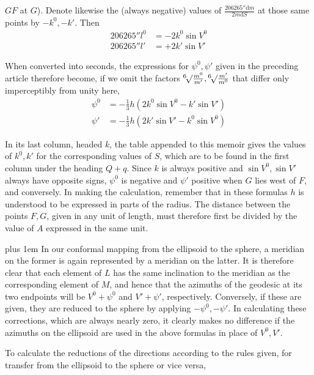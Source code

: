 %
\(GF\) at \(G\)). Denote likewise the (always negative) values of \(\tfrac{206265''\mathrm{d}m}{2m\mathrm{d}S}\) at those same points by \(-k^0,-k'\). Then
\[
\begin{aligned}
206265''l^0&=-2k^0\sin V^0\\
206265''l'&=+2k'\sin V'
\end{aligned}
\]

When converted into seconds, the expressions for \(\psi^0,\psi'\) given in the preceding article therefore become, if we omit the factors \(\BareRoot[6]{\tfrac{m^0}{m'}},\BareRoot[6]{\tfrac{m'}{m^0}}\) that differ only imperceptibly from unity here,
\[
\begin{aligned}
\psi^0&=-\tfrac{1}{3}h(2k^0\sin V^0-k'\sin V')\\
\psi'&=-\tfrac{1}{3}h(2k'\sin V'-k^0\sin V^0)
\end{aligned}
\]

In its last column, headed \(k\), the table appended to this memoir gives the values of \(k^0,k'\) for the corresponding values of \(S\), which are to be found in the first column under the heading \(Q+q\). Since \(k\) is always positive and \(\sin V^0,\sin V'\) always have opposite signs, \(\psi^0\) is negative and \(\psi'\) positive when \(G\) lies west of \(F\), and conversely. In making the calculation, remember that in these formulas \(h\) is understood to be expressed in parts of the radius. The distance between the points \(F,G\), given in any unit of length, must therefore first be divided by the value of \(A\) expressed in the same unit.

\begingroup\rightskip=0pt plus 1em
In our conformal mapping from the ellipsoid to the sphere, a meridian on the former is again represented by a meridian on the latter. It is therefore clear that each element of \(L\) has the same inclination to the meridian as the corresponding element of \(M\), and hence that the azimuths of the geodesic at its two endpoints will be \(V^0+\psi^0\) and \(V'+\psi'\), respectively. Conversely, if these are given, they are reduced to the sphere by applying \(-\psi^0,-\psi'\). In calculating these corrections, which are always nearly zero, it clearly makes no difference if the azimuths on the ellipsoid are used in the above formulas in place of \(V^0,V'\).\par\endgroup

To calculate the reductions of the directions according to the rules given, for transfer from the ellipsoid to the sphere or vice versa,
